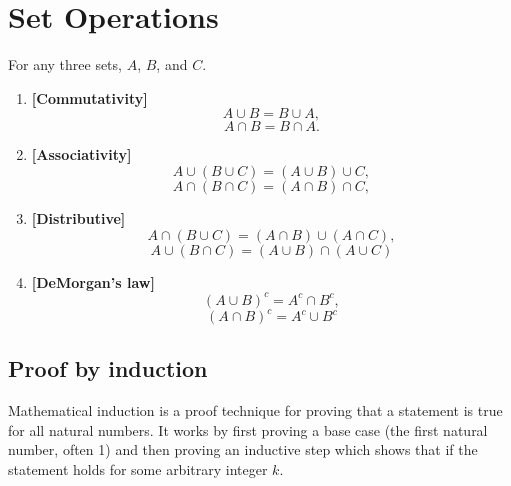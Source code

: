 \section{Set Operations}

\begin{theorem}
    For any three sets, $A$, $B$, and $C$.
    \begin{enumerate}[label=S\arabic*]
    \item \textbf{[Commutativity]}\quad  \[A \cup B = B \cup A,\] \[A \cap B = B \cap A.\]
    \item \textbf{[Associativity]}\quad   \[A \cup (B \cup C) = (A \cup B) \cup C,\] \[A \cap (B \cap C) = (A \cap B) \cap C,\]
    \item \textbf{[Distributive]}\quad   \[A \cap (B \cup C) = (A \cap B) \cup (A \cap C),\] \[A \cup (B \cap C) = (A \cup B) \cap (A \cup C)\]
    \item \textbf{[DeMorgan's law]}\quad   \[(A \cup B)^c = A^c \cap B^c, \] \[(A \cap B)^c = A^c \cup B^c\]
    \end{enumerate}
\end{theorem}

\subsection{Proof by induction}

Mathematical induction is a proof technique for proving that a statement is true for all natural numbers. It works by first proving a base case (the first natural number, often 1) 
and then proving an inductive step which shows that if the statement holds for some arbitrary integer $k$. 

\begin{figure}[ht]
    \centering
\end{figure}


